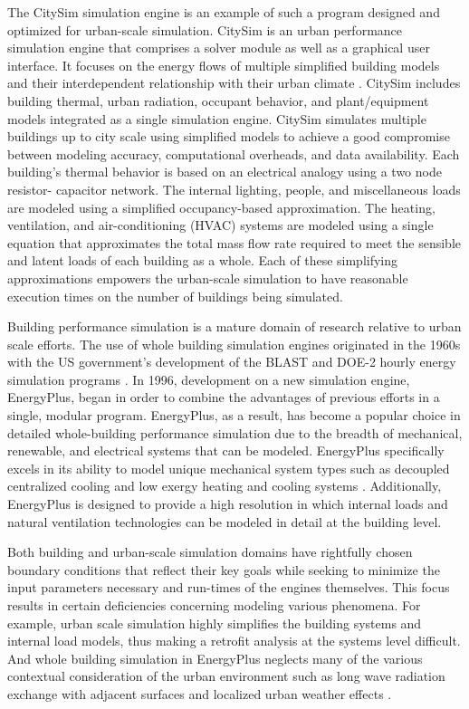 \documentclass{tBPS2e}
\theoremstyle{plain}
\theoremstyle{definition}
\theoremstyle{remark}
\newcommand{\noteDT}[1]{\footnote{\textcolor{green}{#1}}}
\begin{document}
The CitySim simulation engine is an example of such a program designed and
optimized for urban-scale simulation. CitySim is an urban performance
simulation engine that comprises a solver module as well as a graphical user
interface. It focuses on the energy flows of multiple simplified building
models and their interdependent relationship with their urban climate
\citep{Robinson:2009tm}. CitySim includes building thermal, urban radiation,
occupant behavior, and plant/equipment models integrated as a single
simulation engine. CitySim simulates multiple buildings up to city scale using
simplified models to achieve a good compromise between modeling
accuracy, computational overheads, and data availability. Each building's
thermal behavior is based on an electrical analogy using a two node resistor-
capacitor network. The internal lighting, people, and miscellaneous loads are
modeled using a simplified occupancy-based approximation. The heating,
ventilation, and air-conditioning (HVAC) systems are modeled using a single
equation that approximates the total mass flow rate required to meet the
sensible and latent loads of each building as a whole. Each of these
simplifying approximations empowers the urban-scale simulation to have
reasonable execution times on the number of buildings being
simulated.

Building performance simulation is a mature domain of research relative to
urban scale efforts. The use of whole building simulation engines originated
in the 1960s with the US government's development of the BLAST and DOE-2
hourly energy simulation programs \citep{Lawrie:2001vf}. In 1996, development
on a new simulation engine, EnergyPlus, began in order to combine the
advantages of previous efforts in a single, modular program. EnergyPlus, as a
result, has become a popular choice in detailed whole-building performance
simulation due to the breadth of mechanical, renewable, and electrical systems
that can be modeled. EnergyPlus specifically excels in its ability to model
unique mechanical system types such as decoupled centralized cooling
\citep{Miller:2010wa} and low exergy heating and cooling systems
\citep{barbara:2015tz}. Additionally, EnergyPlus is designed to provide a high
resolution in which internal loads and natural ventilation technologies can be
modeled in detail at the building level.

Both building and urban-scale simulation domains have rightfully chosen
boundary conditions that reflect their key goals while seeking to minimize the
input parameters necessary and run-times of the engines themselves. This focus
results in certain deficiencies concerning modeling various phenomena.
For example, urban scale simulation highly simplifies the building systems and
internal load models, thus making a retrofit analysis at the systems level
difficult. And whole building simulation in EnergyPlus neglects many of the
various contextual consideration of the urban environment such as long wave
radiation exchange with adjacent surfaces and localized urban weather effects
\citep{Lawrie:2001vf}.%
\end{document}
